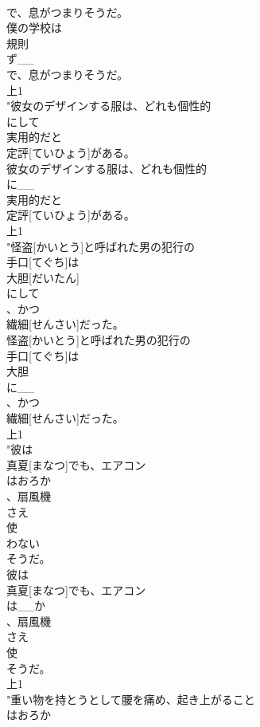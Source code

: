 \documentclass[8pt]{extreport}
\begin{document}
\begin{CJK}{UTF8}{min}
\\	で、息がつまりそうだ。
\\	僕の学校は
\\	規則
\\	ず__
\\	で、息がつまりそうだ。
\\	上1
\\	"彼女のデザインする服は、どれも個性的
\\	にして
\\	実用的だと
\\	定評[ていひょう]がある。
\\	彼女のデザインする服は、どれも個性的
\\	に__
\\	実用的だと
\\	定評[ていひょう]がある。
\\	上1
\\	"怪盗[かいとう]と呼ばれた男の犯行の
\\	手口[てぐち]は
\\	大胆[だいたん]
\\	にして
\\	、かつ
\\	繊細[せんさい]だった。
\\	怪盗[かいとう]と呼ばれた男の犯行の
\\	手口[てぐち]は
\\	大胆
\\	に__
\\	、かつ
\\	繊細[せんさい]だった。
\\	上1
\\	"彼は
\\	真夏[まなつ]でも、エアコン
\\	はおろか
\\	、扇風機
\\	さえ
\\	使
\\	わない
\\	そうだ。
\\	彼は
\\	真夏[まなつ]でも、エアコン
\\	は__か
\\	、扇風機
\\	さえ
\\	使
\\	そうだ。
\\	上1
\\	"重い物を持とうとして腰を痛め、起き上がること
\\	はおろか

\end{CJK}
\end{document}

